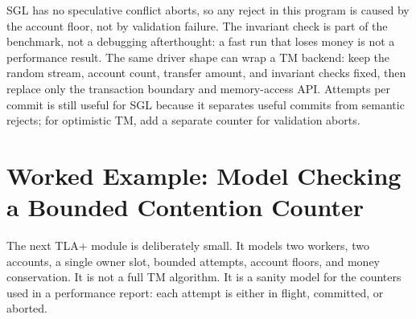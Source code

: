SGL has no speculative conflict aborts, so any reject in this program is caused by the account floor, not by validation failure. The invariant check is part of the benchmark, not a debugging afterthought: a fast run that loses money is not a performance result. The same driver shape can wrap a TM backend: keep the random stream, account count, transfer amount, and invariant checks fixed, then replace only the transaction boundary and memory-access API. Attempts per commit is still useful for SGL because it separates useful commits from semantic rejects; for optimistic TM, add a separate counter for validation aborts.

\section[Model Checking a Bounded Contention Counter]{Worked Example: Model Checking a Bounded Contention Counter}
\label{sec:perf-tla-bank}

The next TLA+ module is deliberately small. It models two workers, two
accounts, a single owner slot, bounded attempts, account floors, and money
conservation. It is not a full TM algorithm. It is a sanity model for the
counters used in a performance report: each attempt is either in flight,
committed, or aborted.

